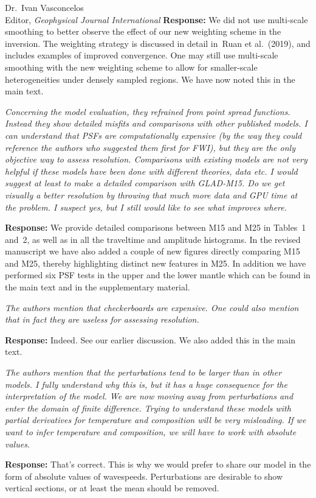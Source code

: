 \documentclass[11pt,a4paper]{letter}
\newcommand{\response}[1]{\textbf{Response:} #1}
\newcommand{\rev}[1]{{\it{#1}}}
\begin{document}
\begin{letter}{Dr.~Ivan Vasconcelos\\
Editor, \textit{Geophysical Journal International}}
\response{We did not use multi-scale smoothing to better observe the effect of our new weighting scheme in the inversion. The weighting strategy is discussed in detail in~Ruan et al.~(2019), and includes examples of improved convergence.
One may still use multi-scale smoothing with the new weighting scheme to allow for smaller-scale heterogeneities under densely sampled regions. We have now noted this in the main text. 
}

\rev{Concerning the model evaluation, they refrained from point spread functions. Instead they show detailed misfits and comparisons with other published models.
I can understand that PSFs are computationally expensive (by the way they could reference the authors who suggested them first for FWI), but they are the only objective way to assess resolution.
Comparisons with existing models are not very helpful if these models have been done with different theories, data etc.
I would suggest at least to make a detailed comparison with GLAD-M15. Do we get visually a better resolution by throwing that much more data and GPU time at the problem. I suspect yes, but I still would like to see what improves where. 
}

\response{We provide detailed comparisons between M15 and M25 in Tables~1 and~2, as well as in all the traveltime and amplitude histograms.
In the revised manuscript we have also added a couple of new figures directly comparing M15 and M25, thereby highlighting distinct new features in M25. In addition we have performed six PSF tests in the upper and the lower mantle which can be found in the main text and in the supplementary material.}

\rev{The authors mention that checkerboards are expensive. One could also mention that in fact they are useless for assessing resolution.
}

\response{Indeed. See our earlier discussion. We also added this in the main text.}

\rev{The authors mention that the perturbations tend to be larger than in other models. I fully understand why this is, but it has a huge consequence for the interpretation of the model. We are now moving away from perturbations and enter the domain of finite difference. Trying to understand these models with partial derivatives for temperature and composition will be very misleading. If we want to infer temperature and composition, we will have to work with absolute values.
}

\response{That's correct. This is why we would prefer to share our model in the form of absolute values of wavespeeds.
Perturbations are desirable to show vertical sections, or at least the mean should be removed.
}


\end{letter}
\end{document}
